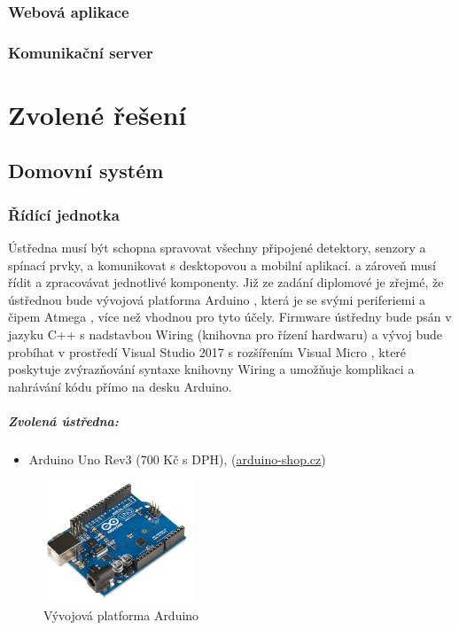 \documentclass[FM,DP]{tulthesis}  %
\begin{document}
\subsection{Webová aplikace}

\subsection{Komunikační server}


\chapter{Zvolené řešení}

\section{Domovní systém}

\subsection{Řídící jednotka}
Ústředna musí být schopna spravovat všechny připojené detektory, senzory a spínací prvky, a komunikovat s desktopovou a mobilní aplikací. a zároveň musí řídit a zpracovávat jednotlivé komponenty. Již ze zadání diplomové je zřejmé, že ústřednou bude vývojová platforma Arduino \cite{Pruvodce arduinem}, která je se svými periferiemi \cite{Arduino schematic} a čipem Atmega \cite{Atmega datasheet}, více než vhodnou pro tyto účely. Firmware ústředny bude psán v jazyku  C++ s nadstavbou Wiring (knihovna pro řízení hardwaru) \cite{Wiring} a vývoj bude probíhat v prostředí Visual Studio 2017 s rozšířením Visual Micro \cite{Visual Micro}, které poskytuje zvýrazňování syntaxe knihovny Wiring a umožňuje komplikaci a nahrávání kódu přímo na desku Arduino.

\paragraph{Zvolená ústředna:}
\begin{itemize}
\item Arduino Uno Rev3 (700 Kč s DPH), (\url{arduino-shop.cz})
\end{itemize}

\begin{figure}[H]
\begin{center}
\includegraphics[width=0.4\textwidth]{images/arduino.png}
\caption{Vývojová platforma Arduino}
\label{image}
\end{center}
\end{figure}
\end{document}
